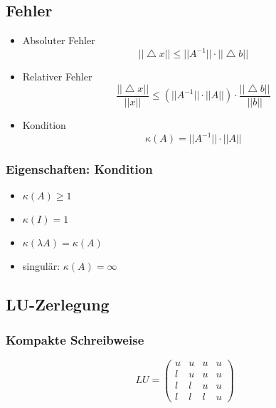 \subsection{Fehler}
\begin{itemize}

	\item Absoluter Fehler
	\begin{equation*}
		||\bigtriangleup x|| \leq ||A^{-1}|| \cdot ||\bigtriangleup b||
	\end{equation*}
	
	\item Relativer Fehler
	\begin{equation*}
		\frac{||\bigtriangleup x||}{||x||} \leq (||A^{-1}|| \cdot ||A||) \cdot \frac{||\bigtriangleup b||}{||b||}
	\end{equation*}
	
	\item Kondition
	\begin{equation*}
		\kappa(A) = ||A^{-1}|| \cdot ||A||
	\end{equation*}

\end{itemize}

\subsubsection*{Eigenschaften: Kondition}
\begin{itemize}
	\item $\kappa(A) \geq 1$
	\item $\kappa(I) = 1$
	\item $\kappa(\lambda A) = \kappa(A)$
	\item singulär: $\kappa(A) = \infty$
\end{itemize}

\subsection{LU-Zerlegung}

\subsubsection*{Kompakte Schreibweise}
\begin{displaymath}
	LU = 
	\begin{pmatrix}
		u & u & u & u \\
		l & u & u & u \\
		l & l & u & u \\
		l & l & l & u
	\end{pmatrix}
\end{displaymath}

